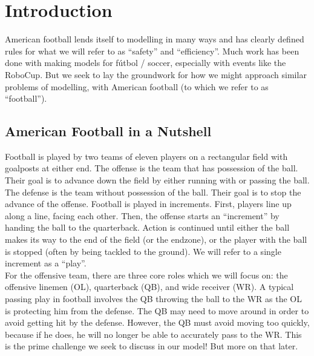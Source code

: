 \setcounter{page}{1} %

\section{Introduction} %

\quad American football lends itself to modelling in many ways and has clearly defined rules for what we will refer to as “safety” and “efficiency”. Much work has been done with making models for fútbol / soccer, especially with events like the RoboCup. But we seek to lay the groundwork for how we might approach similar problems of modelling, with American football (to which we refer to as “football”). \\

\subsection{American Football in a Nutshell}

\quad Football is played by two teams of eleven players on a rectangular field with goalposts at either end. The offense is the team that has possession of the ball. Their goal is to advance down the field by either running with or passing the ball. The defense is the team without possession of the ball. Their goal is to stop the advance of the offense. Football is played in increments. First, players line up along a line, facing each other. Then, the offense starts an “increment” by handing the ball to the quarterback. Action is continued until either the ball makes its way to the end of the field (or the endzone), or the player with the ball is stopped (often by being tackled to the ground). We will refer to a single increment as a “play”. \\ 
 
For the offensive team, there are three core roles which we will focus on: the offensive linemen (OL), quarterback (QB), and wide receiver (WR). A typical passing play in football involves the QB throwing the ball to the WR as the OL is protecting him from the defense. The QB may need to move around in order to avoid getting hit by the defense. However, the QB must avoid moving too quickly, because if he does, he will no longer be able to accurately pass to the WR. This is the prime challenge we seek to discuss in our model! But more on that later. \\ 
 
